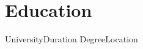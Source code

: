 \section{Education}
  \resumeSubHeadingListStart
    \resumeEduheading
      {University}{Duration}
      {Degree}{Location}
  \resumeSubHeadingListEnd
